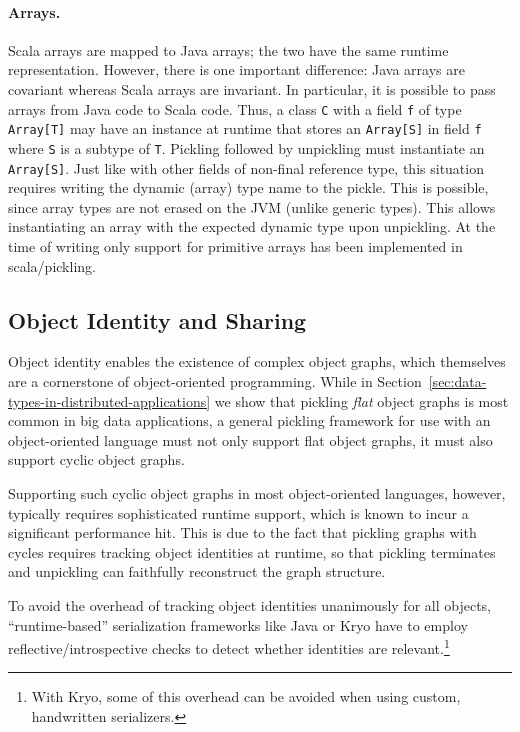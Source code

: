 \documentclass[10pt]{sigplanconf}
\theoremstyle{definition}
\theoremstyle{definition}
\begin{document}
\paragraph{Arrays.} Scala arrays are mapped to Java arrays;  the two have the
same runtime representation. However, there is one important difference: Java
arrays are covariant whereas Scala arrays are invariant. In particular, it is
possible to pass arrays from Java code to Scala code. Thus, a class \verb|C|
with a field \verb|f| of type \verb|Array[T]| may have an instance at runtime
that stores an \verb|Array[S]| in field \verb|f| where \verb|S| is a subtype
of \verb|T|. Pickling followed by unpickling must instantiate an
\verb|Array[S]|. Just like with other fields of non-final reference type, this
situation requires writing the dynamic (array) type name to the pickle. This
is possible, since array types are not erased on the JVM (unlike generic
types). This allows instantiating an array with the expected dynamic type upon
unpickling. At the time of writing only support for primitive arrays has been
implemented in scala/pickling.


\subsection{Object Identity and Sharing}
\label{sec:object-identity}

Object identity enables the existence of complex object graphs, which
themselves are a cornerstone of object-oriented programming. While in
Section~\ref{sec:data-types-in-distributed-applications} we show that pickling
\textit{flat} object graphs is most common in big data applications, a general
pickling framework for use with an object-oriented language must not only
support flat object graphs, it must also support cyclic object graphs.

Supporting such cyclic object graphs in most object-oriented languages,
however, typically requires sophisticated runtime support, which is known to
incur a significant performance hit. This is due to the fact that pickling
graphs with cycles requires tracking object identities at runtime, so that
pickling terminates and unpickling can faithfully reconstruct the graph
structure.

To avoid the overhead of tracking object identities unanimously for all
objects, ``runtime-based'' serialization frameworks like Java or Kryo have to
employ reflective/introspective checks to detect whether identities are
relevant.\footnote{With Kryo, some of this overhead can be avoided when using custom, handwritten serializers.}
\end{document}
